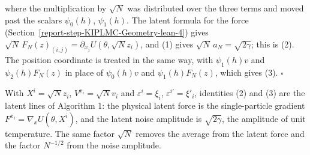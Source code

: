 \documentclass[11pt,a4paper]{report}
\begin{document}
where the multiplication by \(\sqrt N\) was distributed over the three terms and moved past the scalars \(\psi_0(h)\), \(\psi_1(h)\). The latent formula for the force (Section~\ref{report-step-KIPLMC-Geometry-lean-4}) gives \(\sqrt N\,F_N(z)_{(i,j)}=\partial_{x_j}U(\theta,\sqrt Nz_i)\), and (1) gives \(\sqrt N\,a_N=\sqrt{2\gamma}\); this is (2). The position coordinate is treated in the same way, with \(\psi_1(h)v\) and \(\psi_2(h)F_N(z)\) in place of \(\psi_0(h)v\) and \(\psi_1(h)F_N(z)\), which gives (3). \(\square\)




With \(X^i=\sqrt Nz_i\), \(V^{x_i}=\sqrt Nv_i\) and \(\varepsilon^i=\xi_i\), \(\varepsilon^{i\prime}=\xi'_i\), identities (2) and (3) are the latent lines of Algorithm 1: the physical latent force is the single-particle gradient \(F^{x_i}=\nabla_xU(\theta,X^i)\), and the latent noise amplitude is \(\sqrt{2\gamma}\), the amplitude of unit temperature. The same factor \(\sqrt N\) removes the average from the latent force and the factor \(N^{-1/2}\) from the noise amplitude.
\end{document}
